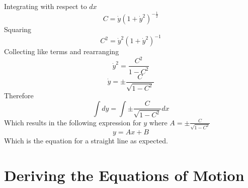 Integrating with respect to $dx$
\[C = \dot{y}\left(1+\dot{y}^2\right)^{-\frac{1}{2}}\]
Squaring
\[C^2 = \dot{y}^2\left(1+\dot{y}^2\right)^{-1}\]
Collecting like terms and rearranging
\[\dot{y}^2 = \frac{C^2}{1-C^2}\]
\[\dot{y} = \pm\frac{C}{\sqrt{1-C^2}}\]
Therefore
\[\int dy = \int \pm\frac{C}{\sqrt{1-C^2}} dx\]
Which results in the following expression for $y$ where
$A=\pm\frac{C}{\sqrt{1-C^2}}$
\begin{equation}
	y = Ax + B
\end{equation}
Which is the equation for a straight line as expected.

\section{Deriving the Equations of Motion}
\label{sec:DerivingTheEquationsOfMotion}
